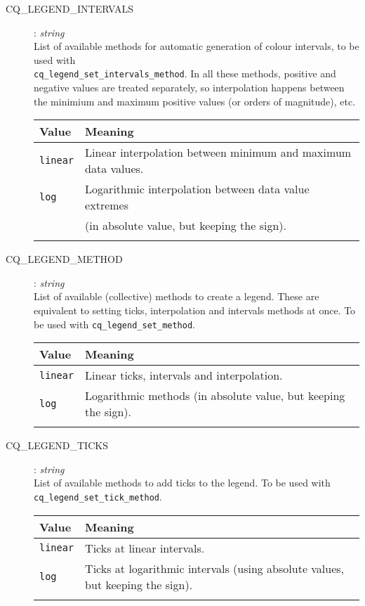 \documentclass[a4paper,notitlepage,11pt]{article}
\begin{document}
\begin{description}
\item[CQ\_LEGEND\_INTERVALS]: \textit{string}\\
  List of available methods for automatic generation of colour intervals, to be used with \\
  \texttt{cq\_legend\_set\_intervals\_method}.
  In all these methods, positive and negative values are treated
  separately, so interpolation happens between the minimium and maximum positive values (or orders of magnitude), etc.\\
  \begin{tabular}{ll}
    \\
    \hline\hline
    Value&Meaning\\
    \hline
    \texttt{linear}&Linear interpolation between minimum and maximum data values.\\
    \texttt{log}&Logarithmic interpolation between data value extremes\\&(in absolute value, but keeping the sign).\\
    \hline\hline
    \\
  \end{tabular}

\item[CQ\_LEGEND\_METHOD]: \textit{string}\\
  List of available (collective) methods to create a legend. These are equivalent to setting 
  ticks, interpolation and intervals methods at once. To be used with
  \texttt{cq\_legend\_set\_method}.\\
  \begin{tabular}{ll}
    \\
    \hline\hline
    Value&Meaning\\
    \hline
    \texttt{linear}&Linear ticks, intervals and interpolation.\\
    \texttt{log}&Logarithmic methods (in absolute value, but keeping the sign).\\
    \hline\hline
    \\
  \end{tabular}

\item[CQ\_LEGEND\_TICKS]: \textit{string}\\
  List of available methods to add ticks to the legend. To be used with
  \texttt{cq\_legend\_set\_tick\_method}.\\
  \begin{tabular}{ll}
    \\
    \hline\hline
    Value&Meaning\\
    \hline
    \texttt{linear}&Ticks at linear intervals.\\
    \texttt{log}&Ticks at logarithmic intervals (using absolute values, but keeping the sign).\\
    \hline\hline
    \\
  \end{tabular}
\end{description}
\end{document}
